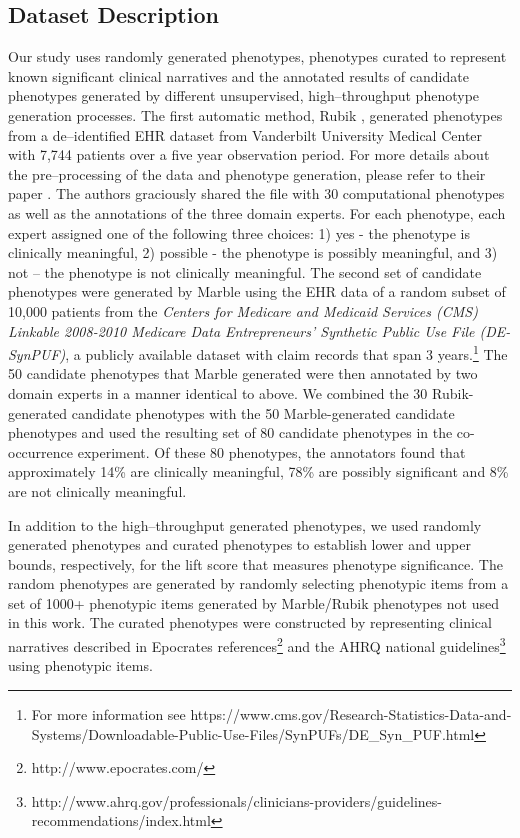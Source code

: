 \documentclass{sig-alternate}
\begin{document}
\subsection{Dataset Description}
Our study uses randomly generated phenotypes, phenotypes curated to represent known significant clinical narratives and the annotated results of candidate phenotypes generated by different unsupervised, high--throughput phenotype generation processes. The first automatic method, Rubik \cite{wang2015rubik},
generated phenotypes from a de--identified EHR dataset from Vanderbilt University Medical Center with 7,744 patients over a five year observation period.
For more details about the pre--processing of the data and phenotype generation, please refer to their paper \cite{wang2015rubik}.
The authors graciously shared the file with 30 computational phenotypes as well as the annotations of the three domain experts.
For each phenotype, each expert assigned one of the following three choices: 1) yes - the phenotype is clinically meaningful, 2) possible - the phenotype is possibly meaningful, and 3) not -- the phenotype is not clinically meaningful.
The second set of candidate phenotypes were generated by Marble \cite{Ho:2014da} using the EHR data of a random subset of 10,000 patients from the \emph{Centers for Medicare and Medicaid Services (CMS) Linkable 2008-2010 Medicare Data Entrepreneurs' Synthetic Public Use File (DE-SynPUF)}, a publicly available dataset with claim records that span 3 years.\footnote{For more information see https://www.cms.gov/Research-Statistics-Data-and-Systems/Downloadable-Public-Use-Files/SynPUFs/DE\_Syn\_PUF.html}
The 50 candidate phenotypes that Marble generated were then annotated by two domain experts in a manner identical to above.
We combined the 30 Rubik-generated candidate phenotypes with the 50 Marble-generated candidate phenotypes and used the resulting set of 80 candidate phenotypes in the co-occurrence experiment.
Of these 80 phenotypes,  the annotators found that approximately 14\% are clinically meaningful, 78\% are possibly significant and 8\% are not clinically meaningful.

In addition to the high--throughput generated phenotypes, we used randomly generated phenotypes and curated phenotypes to establish lower and upper bounds, respectively, for the lift score that measures phenotype significance. The random phenotypes are generated by randomly selecting phenotypic items from a set of 1000+ phenotypic items generated by Marble/Rubik phenotypes not used in this work. The curated phenotypes were constructed by representing clinical narratives described in Epocrates references\footnote{http://www.epocrates.com/} and the AHRQ national guidelines\footnote{http://www.ahrq.gov/professionals/clinicians-providers/guidelines-recommendations/index.html} using phenotypic items. 
\end{document}
